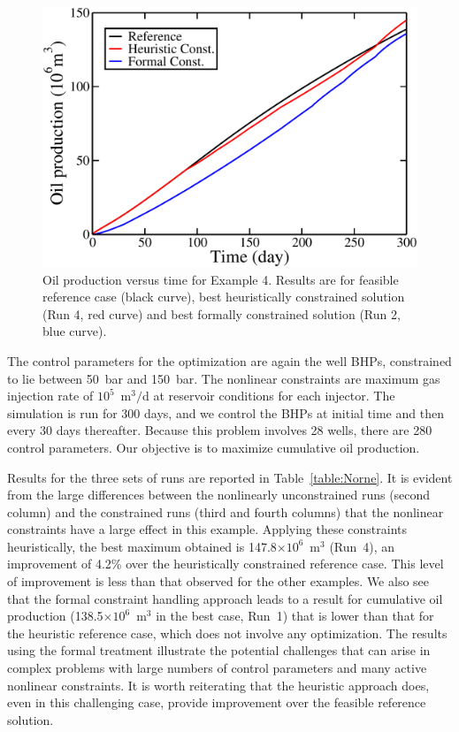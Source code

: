 \documentclass[twocolumn,numbook]{svjour3}          %
\begin{document}
\begin{figure} [ht]
\begin{center}
\includegraphics[totalheight=2.18in,angle=0]{NorneRevenue.pdf}
\end{center}
\caption{Oil production versus time for Example 4. Results are for
  feasible reference case (black curve), best heuristically constrained solution (Run 4, red curve)
  and best formally constrained solution (Run 2, blue curve).}
\label{fig:NorneRevenue}
\end{figure}



The control parameters for the optimization are again the well BHPs, constrained
to lie between 50~bar and 150~bar. The nonlinear constraints are maximum gas
injection rate of $10^5$~m$^3/$d at reservoir conditions for each injector. The
simulation is run for 300 days, and we control the BHPs at initial time and then
every 30 days thereafter. Because this problem involves 28 wells, there are 280
control parameters. Our objective is to maximize cumulative oil production.

Results for the three sets of runs are reported in Table~\ref{table:Norne}. It
is evident from the large differences between the nonlinearly unconstrained runs
(second column) and the constrained runs (third and fourth columns) that the
nonlinear constraints have a large effect in this example. Applying these constraints heuristically, the best maximum obtained is
147.8$\times 10^6$~m$^3$ (Run~4), an improvement of 4.2\% over the heuristically constrained
reference case. This level of improvement is less than that observed for the
other examples. We also see that the formal constraint handling approach leads
to a result for cumulative oil production (138.5$\times 10^6$~m$^3$ in the best case, Run~1)
that is lower than that for the heuristic reference case, which does
not involve any optimization. The results using the formal treatment illustrate the potential challenges that can
arise in complex problems with large numbers of control parameters and many active nonlinear
constraints. It is worth reiterating that the heuristic approach does, even in
this challenging case, provide improvement over the feasible reference solution.
\end{document}
